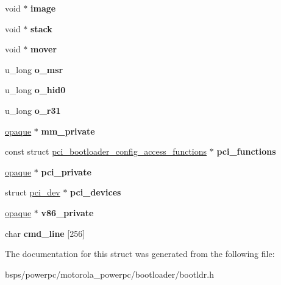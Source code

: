 \begin{DoxyCompactItemize}
void $\ast$ {\bfseries image}
\item 
\mbox{\label{struct__boot__data_a5d702ba377728100d0875ea076e79b94}} 
void $\ast$ {\bfseries stack}
\item 
\mbox{\label{struct__boot__data_ae94112d977ea88893bf61169f2a72276}} 
void $\ast$ {\bfseries mover}
\item 
\mbox{\label{struct__boot__data_a6195c0b5237e1f45513fdeb094226c46}} 
u\+\_\+long {\bfseries o\+\_\+msr}
\item 
\mbox{\label{struct__boot__data_a8bbfad5ed46c99fa59cfba93054ea4e4}} 
u\+\_\+long {\bfseries o\+\_\+hid0}
\item 
\mbox{\label{struct__boot__data_a8b057ae64ebfab751bd4621817c7cf31}} 
u\+\_\+long {\bfseries o\+\_\+r31}
\item 
\mbox{\label{struct__boot__data_a695a3b7fc758768764244ee2fb1864ae}} 
\mbox{\hyperlink{structopaque}{opaque}} $\ast$ {\bfseries mm\+\_\+private}
\item 
\mbox{\label{struct__boot__data_a73e4e542db72b606cf225753a07579a8}} 
const struct \mbox{\hyperlink{structpci__bootloader__config__access__functions}{pci\+\_\+bootloader\+\_\+config\+\_\+access\+\_\+functions}} $\ast$ {\bfseries pci\+\_\+functions}
\item 
\mbox{\label{struct__boot__data_a8d5566749ad7b66cfcf472d5a6cad5ce}} 
\mbox{\hyperlink{structopaque}{opaque}} $\ast$ {\bfseries pci\+\_\+private}
\item 
\mbox{\label{struct__boot__data_ababa61c3c359dabfb21f0ca9714f3935}} 
struct \mbox{\hyperlink{structpci__dev}{pci\+\_\+dev}} $\ast$ {\bfseries pci\+\_\+devices}
\item 
\mbox{\label{struct__boot__data_a324565ebd607a1598cc46da2485ac4ad}} 
\mbox{\hyperlink{structopaque}{opaque}} $\ast$ {\bfseries v86\+\_\+private}
\item 
\mbox{\label{struct__boot__data_afef3842007e0883d219681e3ed598ff0}} 
char {\bfseries cmd\+\_\+line} \mbox{[}256\mbox{]}
\end{DoxyCompactItemize}


The documentation for this struct was generated from the following file\+:\begin{DoxyCompactItemize}
\item 
bsps/powerpc/motorola\+\_\+powerpc/bootloader/bootldr.\+h\end{DoxyCompactItemize}
